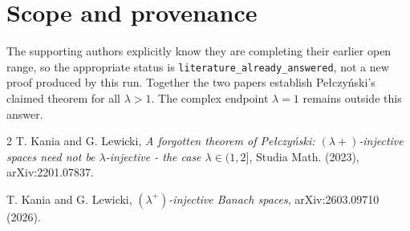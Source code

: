 \documentclass[11pt]{article}
\begin{document}
\section*{Scope and provenance}

The supporting authors explicitly know they are completing their earlier
open range, so the appropriate status is
\texttt{literature\_already\_answered}, not a new proof produced by this
run. Together the two papers establish Pe{\l}czy\'nski's claimed theorem for
all \(\lambda>1\). The complex endpoint \(\lambda=1\) remains outside this
answer.

\begin{thebibliography}{2}
T. Kania and G. Lewicki,
\emph{A forgotten theorem of Pe{\l}czy\'nski:
\((\lambda+)\)-injective spaces need not be \(\lambda\)-injective - the case
\(\lambda\in(1,2]\)}, Studia Math. (2023), arXiv:2201.07837.

T. Kania and G. Lewicki,
\emph{\((\lambda^+)\)-injective Banach spaces},
arXiv:2603.09710 (2026).
\end{thebibliography}
\end{document}
